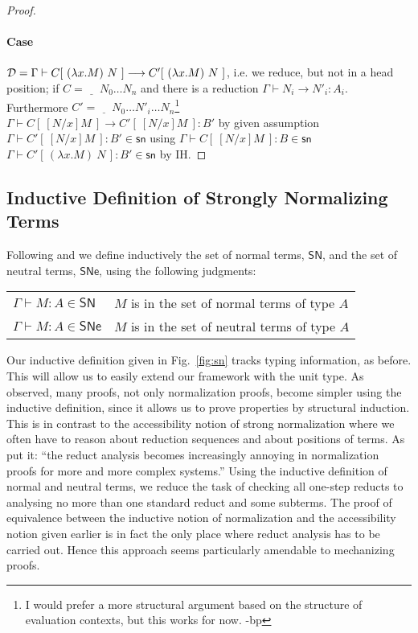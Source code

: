 \documentclass{article}
\newcommand{\SN}{\mathsf{SN}}
\newcommand{\SNe}{\mathsf{SNe}}
\newcommand{\csn}{\mathsf{sn}}
\newcommand{\red}{\longrightarrow}
\begin{document}
\begin{proof}
\paragraph{Case} $\D = \Gamma \vdash C[~(\lambda x.M)~N~] \red C'[~(\lambda x.M)~N~]$, i.e. we reduce, but not in a head position; if $C = \underline{\quad}~N_0\ldots N_n$ and there is a reduction $\Gamma \vdash N_i \red N'_i : A_i$. Furthermore $C' = \underline{\quad}~N_0\ldots N'_i \ldots N_n$\footnote{I would prefer a more structural argument based on the structure of evaluation contexts, but this works for now. -bp}
\\[0.5em]
$\Gamma \vdash  C[~[N/x]M~] \red  C'[~[N/x]M~] : B'$ \hfill by given assumption \\
$\Gamma \vdash C'[~[N/x]M~] : B' \in \csn$ \hfill using  $\Gamma \vdash C[~[N/x]M~] : B \in \csn$ 
\\
$\Gamma \vdash C'[\,(\lambda x.M)~N\,] : B' \in \csn$ \hfill by IH.

\end{proof}


\subsection{Inductive Definition of Strongly Normalizing Terms}
Following \cite{Raamsdonk_onnormalisation} and \cite{Joachimski2003} we define inductively the set of normal terms, $\SN$, and the set of neutral terms, $\SNe$, using the following judgments:
\\%

\begin{center}
\begin{tabular}{ll}
$\Gamma \vdash M : A \in \SN$  & $M$ is in the set of normal terms of  type $A$\\
$\Gamma \vdash M : A \in \SNe$ & $M$ is in the set of neutral terms of type $A$
\end{tabular}
\end{center}

Our inductive definition given in Fig.~\ref{fig:sn} tracks typing information, as before. This will allow us to easily extend our framework with the unit type.
As \cite{Raamsdonk_onnormalisation} observed, many proofs, not only normalization proofs, become simpler using the inductive definition, since it allows us  to prove properties by structural induction. This is in contrast to the accessibility notion of strong normalization where we often have to reason about reduction sequences and about positions of terms. As \cite{Joachimski2003}  put it: ``the reduct analysis becomes increasingly annoying in normalization proofs for more and more complex systems.'' Using the inductive definition of normal and neutral terms, we reduce the task of checking all one-step reducts to analysing no more than one standard reduct
and some subterms.  The proof of equivalence between the inductive notion of normalization and the accessibility notion given earlier is in fact the only place where reduct analysis has to be carried out.
Hence this approach seems particularly amendable to mechanizing proofs.
\end{document}
